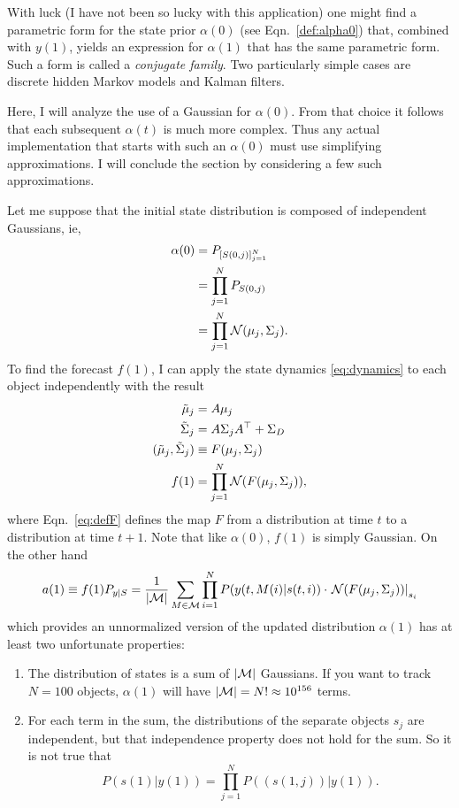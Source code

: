 \documentclass[12pt]{article}
\newcommand{\normal}[2]{{\cal N}(#1,#2)}
\newcommand{\M}{{\cal M}}
\newcommand{\transpose}{^\top}
\newcommand{\os}[4]{{\left[ #1(#2) \right]}_{#3}^{#4}} %
\newcommand{\ti}[2]{{#1}{(#2)}}                         %
\begin{document}
With luck (I have not been so lucky with this application) one might
find a parametric form for the state prior $\alpha(0)$ (see
Eqn.~\eqref{def:alpha0}) that, combined with $\ti{y}{1}$, yields an
expression for $\alpha(1)$ that has the same parametric form.  Such a
form is called a \emph{conjugate family}.  Two particularly simple
cases are discrete hidden Markov models and Kalman filters.

Here, I will analyze the use of a Gaussian for $\alpha(0)$.  From that
choice it follows that each subsequent $\ti{\alpha}{t}$ is much more
complex.  Thus any actual implementation that starts with such an
$\alpha(0)$ must use simplifying approximations.  I will conclude the
section by considering a few such approximations.

Let me suppose that the initial state distribution is composed of
independent Gaussians, ie,
\begin{align*}
  \ti{\alpha}{0} &= P_{\os{S}{0,j}{j=1}{N} }\\
  &= \prod_{j=1}^{N} P_{\ti{S}{0,j}} \\
  &= \prod_{j=1}^{N} \normal{\mu_j}{\Sigma_j}.
\end{align*}
To find the forecast $\ti{f}{1}$, I can apply the state dynamics
\eqref{eq:dynamics} to each object independently with the result
\begin{align}
  \tilde \mu_j &= A \mu_j \\
  \tilde \Sigma_j &= A \Sigma_j A\transpose + \Sigma_D \\
  \label{eq:defF}
  (\tilde \mu_j, \tilde \Sigma_j ) &\equiv F(\mu_j,\Sigma_j) \\
  \label{eq:f1}
  \ti{f}{1} &= \prod_{j=1}^{N} {\cal N}(F(\mu_j,\Sigma_j)),
\end{align}
where Eqn.~\eqref{eq:defF} defines the map $F$ from a distribution at
time $t$ to a distribution at time $t+1$.  Note that like
$\ti{\alpha}{0}$, $\ti{f}{1}$ is simply Gaussian.  On the other hand
\begin{equation}
  \label{eq:a1}
  a(1) \equiv f(1) P_{y|S} = \frac{1}{\left| \M \right|} \sum_{M \in \M}
  \prod_{i=1}^N P(y(t,M(i)|s(t,i)) \cdot \left. {\cal
      N}(F(\mu_j,\Sigma_j))\right|_{s_i}
\end{equation}
which provides an unnormalized version of the updated distribution
$\alpha(1)$ has at least two unfortunate properties:
\begin{enumerate}
\item The distribution of states is a sum of $\left| \M \right|$
  Gaussians.  If you want to track $N=100$ objects, $\alpha(1)$ will
  have $\left| \M \right| = N! \approx 10^{156}$ terms.
\item For each term in the sum, the distributions of the separate
  objects $s_j$ are independent, but that independence property does
  not hold for the sum.  So it is not true that
  \begin{equation*}
    P(s(1)|y(1)) = \prod_{j=1}^N  P\left( \left( s(1,j) \right)|y(1)
    \right).
  \end{equation*}
\end{enumerate}
\end{document}
